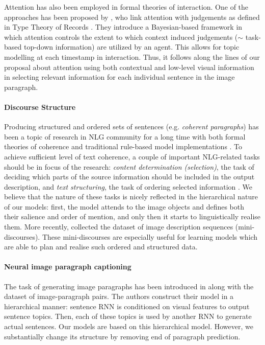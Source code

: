 \documentclass[11pt,a4paper]{article}
\begin{document}
Attention has also been employed in formal theories of interaction. One of the approaches has been proposed by , who link attention with judgements as defined in Type Theory of Records \cite{Cooper08typetheory}.
They introduce a Bayesian-based framework in which attention controls the extent to which context induced judgements ($\sim$ task-based top-down information) are utilized by an agent. This allows for topic modelling at each timestamp in interaction.  Thus, it follows along the lines of our proposal about attention using both contextual and low-level visual information in selecting relevant information for each individual sentence in the image paragraph.

\fi

\paragraph{Discourse Structure}
Producing structured and ordered sets of sentences (e.g. \textit{coherent paragraphs}) has been a topic of research in NLG community for a long time with both formal theories of coherence \cite{grosz95,Barzilay2008} and traditional rule-based model implementations \cite{Reiter00buildingnatural}.
To achieve sufficient level of text coherence, a couple of important NLG-related tasks should be in focus of the research: \textit{content determination (selection)}, the task of deciding which parts of the source information should be included in the output description, and \textit{text structuring}, the task of ordering selected information \cite{Gatt2017}.
We believe that the nature of these tasks is nicely reflected in the hierarchical nature of our models: first, the model attends to the image objects and defines both their salience and order of mention, and only then it starts to linguistically realise them.
More recently,  collected the dataset of image description sequences (mini-discourses).
These mini-discourses are especially useful for learning models which are able to plan and realise such ordered and structured data.

\paragraph{Neural image paragraph captioning}
The task of generating image paragraphs has been introduced in  along with the dataset of image-paragraph pairs.
The authors construct their model in a hierarchical manner: sentence RNN is conditioned on visual features to output sentence topics.
Then, each of these topics is used by another RNN to generate actual sentences.
Our models are based on this hierarchical model.
However, we substantially change its structure by removing end of paragraph prediction.
\end{document}
